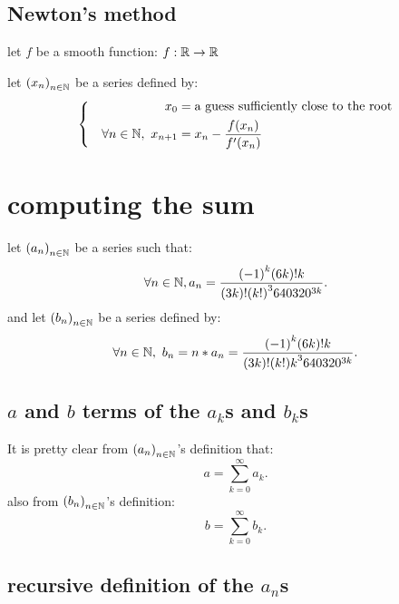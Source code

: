 \documentclass[fleqn]{report}
\begin{document}
\section{Newton's method}
let $ f$ be a smooth function: $ f : \mathbb R \to \mathbb R$

\noindent
let $ {(x_n)}_{n \in \mathbb N}$ be a series defined by:
\begin{align*}
  \left\{
  \begin{aligned}
    x_0                                & = \text{a guess sufficiently close to the root} \\
    \quad \forall n \in \mathbb N,\ x_{n + 1} & = x_n - \frac{f(x_n)}{f'(x_n)}
  \end{aligned}
  \right.
\end{align*}

\chapter{computing the sum}

let ${(a_n)}_{n \in \mathbb N}$ be a series such that:
\[
  \forall n \in \mathbb N, a_n = \frac{{(-1)}^k(6k)!k}{(3k)!{(k!)}^{3}640320^{3k}}
  .\]
and let ${(b_n)}_{n \in \mathbb N}$ be a series defined by:
\[
  \forall n  \in \mathbb N,\ b_n = n * a_n = \frac{{(-1)}^k(6k)!k}{(3k)!{(k!)k}^{3}640320^{3k}}
  .\]

\section{$a$ and  $ b$  terms of the $a_k$s and $b_k$s}
It is pretty clear from $ {(a_n)}_{n \in \mathbb N}$'s definition that:
\[
  a = \sum_{k=0}^{\infty} a_k
  .\]
also from $ {(b_n)}_{n \in \mathbb N}$'s definition:
\[
  b = \sum_{k=0}^{\infty} b_k
  .\]

\section{recursive definition of the $a_n$s}
\end{document}

